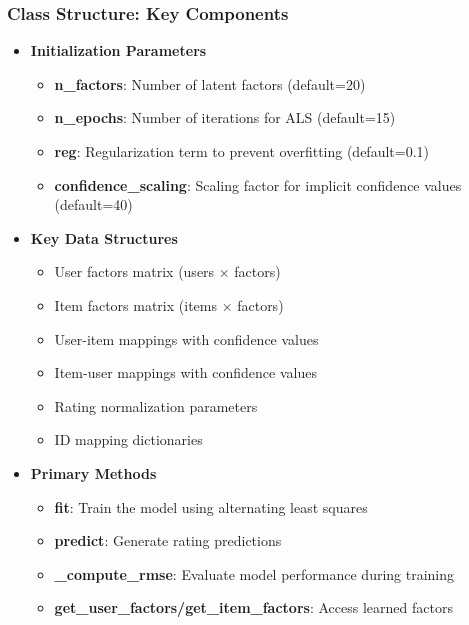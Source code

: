 \documentclass{beamer}
\begin{document}
\begin{frame}
\frametitle{Class Structure: Key Components}

\begin{itemize}
    \item \textbf{Initialization Parameters}
    \begin{itemize}
        \item \textbf{n\_factors}: Number of latent factors (default=20)
        \item \textbf{n\_epochs}: Number of iterations for ALS (default=15)
        \item \textbf{reg}: Regularization term to prevent overfitting (default=0.1)
        \item \textbf{confidence\_scaling}: Scaling factor for implicit confidence values (default=40)
    \end{itemize}
    
    \item \textbf{Key Data Structures}
    \begin{itemize}
        \item User factors matrix (users × factors)
        \item Item factors matrix (items × factors)
        \item User-item mappings with confidence values
        \item Item-user mappings with confidence values
        \item Rating normalization parameters
        \item ID mapping dictionaries
    \end{itemize}
    
    \item \textbf{Primary Methods}
    \begin{itemize}
        \item \textbf{fit}: Train the model using alternating least squares
        \item \textbf{predict}: Generate rating predictions
        \item \textbf{\_compute\_rmse}: Evaluate model performance during training
        \item \textbf{get\_user\_factors/get\_item\_factors}: Access learned factors
    \end{itemize}
\end{itemize}
\end{frame}
\end{document}
